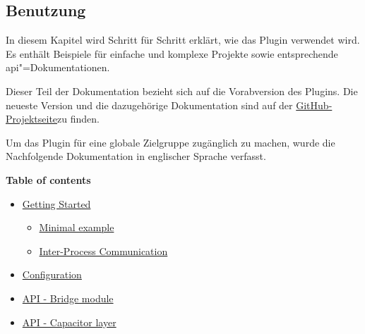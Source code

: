 \subsection{Benutzung}

In diesem Kapitel wird Schritt für Schritt erklärt, wie das Plugin verwendet wird.
Es enthält Beispiele für einfache und komplexe Projekte sowie entsprechende \acs{api}"=Dokumentationen.

Dieser Teil der Dokumentation bezieht sich auf die Vorabversion  des Plugins.
Die neueste Version und die dazugehörige Dokumentation sind auf der \href{https://github.com/hampoelz/Capacitor-BrowserView}{GitHub-Projektseite}\footnotemark[0] zu finden.

Um das Plugin für eine globale Zielgruppe zugänglich zu machen, wurde die Nachfolgende Dokumentation in englischer Sprache verfasst.


\vspace{3em}

\textbf{Table of contents}

\begin{itemize}
    \setlength\itemsep{-1em}
    \item \hyperref[sec:Capacitor-BrowserView:GettingStarted]{Getting Started}
    \vspace{\itemsep}
    \begin{itemize}
        \setlength\itemsep{-1em}
        \item \hyperref[sec:Capacitor-BrowserView:MinimalExample]{Minimal example}
        \item \hyperref[sec:Capacitor-BrowserView:InterprocessCommunication]{Inter-Process Communication}
    \end{itemize}
    \item \hyperref[sec:Capacitor-BrowserView:Configuration]{Configuration}
    \item \hyperref[sec:Capacitor-BrowserView:API_BridgeModule]{API - Bridge module}
    \item \hyperref[sec:Capacitor-BrowserView:API_CapacitorLayer]{API - Capacitor layer}
\end{itemize}

\newpage


\clearpage


\clearpage


\clearpage


